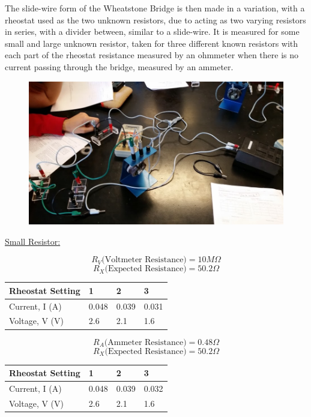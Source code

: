\documentclass[11pt, titlepage]{article}
\begin{document}
The slide-wire form of the Wheatstone Bridge is then made in a variation, with a rheostat used as the two unknown resistors, due to acting as two varying resistors in series, with a divider between, similar to a slide-wire. It is measured for some small and large unknown resistor, taken for three different known resistors with each part of the rheostat resistance measured by an ohmmeter when there is no current passing through the bridge, measured by an ammeter.

\begin{figure}[h]
\centering
\hspace*{0cm}
\includegraphics[scale=0.7, angle=270]{lab13.jpg}
\vspace*{0cm}
\end{figure}

\underline{Small Resistor:}
\begin{center}
$$R_V \text{(Voltmeter Resistance)}= 10 M\Omega$$
$$R_X \text{(Expected Resistance)}= 50.2 \Omega$$
\begin{tabular}
{|m{9em}|m{7em}|m{7em}|m{7em}|}
\hline
Rheostat Setting & 1 & 2 & 3 \\
\hline
Current, I (A) & 0.048 & 0.039 & 0.031 \\
\hline
Voltage, V (V) & 2.6 & 2.1 & 1.6 \\
\hline
\end{tabular}
\end{center}

\begin{center}
$$R_A \text{(Ammeter Resistance)}= 0.48 \Omega$$
$$R_X \text{(Expected Resistance)}= 50.2 \Omega$$
\begin{tabular}
{|m{9em}|m{7em}|m{7em}|m{7em}|}
\hline
Rheostat Setting & 1 & 2 & 3 \\
\hline
Current, I (A) & 0.048 & 0.039 & 0.032 \\
\hline
Voltage, V (V) & 2.6 & 2.1 & 1.6 \\
\hline
\end{tabular}
\end{center}
\end{document}

